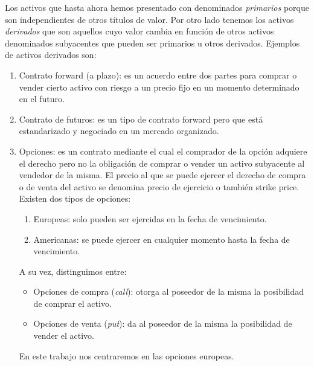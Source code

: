 Los activos que hasta ahora hemos presentado con denominados \textit{primarios} porque son independientes de otros títulos de valor. Por otro lado tenemos los activos \textit{derivados} que son aquellos cuyo valor cambia en función de otros activos denominados subyacentes que pueden ser primarios u otros derivados. Ejemplos de activos derivados son:
\begin{enumerate}
\item Contrato forward (a plazo): es un acuerdo entre dos partes para comprar o vender cierto activo con riesgo a un precio fijo en un momento determinado en el futuro. 
\item Contrato de futuros: es un tipo de contrato forward pero que está estandarizado y negociado en un mercado organizado.
\item Opciones: es un contrato mediante el cual el comprador de la opción adquiere el derecho pero no la obligación de comprar o vender un activo subyacente al vendedor de la misma. El precio al que se puede ejercer el derecho de compra o de venta del activo se denomina precio de ejercicio o también strike price. Existen dos tipos de opciones: 
\begin{enumerate}
	\item Europeas: solo pueden ser ejercidas en la fecha de vencimiento.
	\item Americanas:  se puede ejercer en cualquier momento hasta la fecha de vencimiento.
\end{enumerate}
A su vez, distinguimos entre:
\begin{itemize}
	\item Opciones de compra (\textit{call}): otorga al poseedor de la misma la posibilidad de comprar el activo.
	\item Opciones de venta (\textit{put}): da al poseedor de la misma la posibilidad de vender el activo.
\end{itemize}

En este trabajo nos centraremos en las opciones europeas. 
\end{enumerate} 
